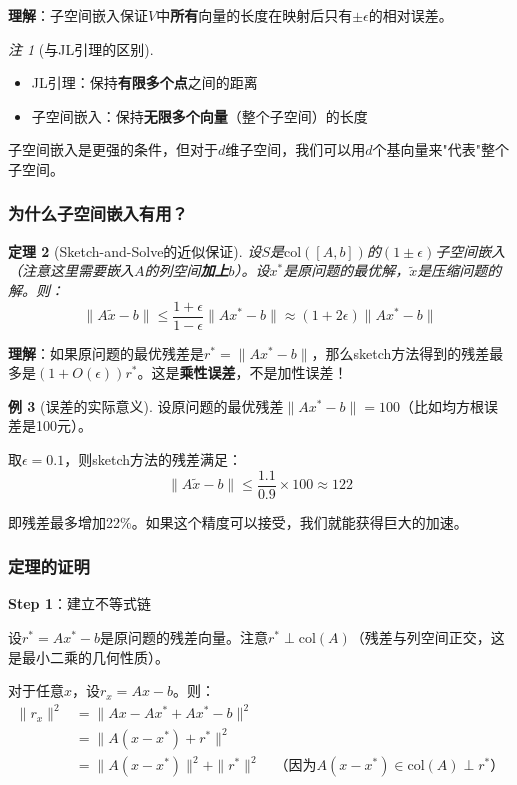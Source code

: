 \documentclass[11pt,a4paper]{ctexart}
\newtheorem{theorem}{定理}[section]
\theoremstyle{definition}
\newtheorem{example}[theorem]{例}
\theoremstyle{remark}
\newtheorem{remark}[theorem]{注}
\begin{document}
\textbf{理解}：子空间嵌入保证$V$中\textbf{所有}向量的长度在映射后只有$\pm \epsilon$的相对误差。

\begin{remark}[与JL引理的区别]
\begin{itemize}
    \item JL引理：保持\textbf{有限多个点}之间的距离
    \item 子空间嵌入：保持\textbf{无限多个向量}（整个子空间）的长度
\end{itemize}
子空间嵌入是更强的条件，但对于$d$维子空间，我们可以用$d$个基向量来"代表"整个子空间。
\end{remark}

\subsubsection{为什么子空间嵌入有用？}

\begin{theorem}[Sketch-and-Solve的近似保证]
设$S$是$\text{col}([A, b])$的$(1 \pm \epsilon)$子空间嵌入（注意这里需要嵌入$A$的列空间\textbf{加上}$b$）。设$x^*$是原问题的最优解，$\tilde{x}$是压缩问题的解。则：
\[
\|A\tilde{x} - b\| \leq \frac{1 + \epsilon}{1 - \epsilon} \|Ax^* - b\| \approx (1 + 2\epsilon)\|Ax^* - b\|
\]
\end{theorem}

\textbf{理解}：如果原问题的最优残差是$r^* = \|Ax^* - b\|$，那么sketch方法得到的残差最多是$(1 + O(\epsilon))r^*$。这是\textbf{乘性误差}，不是加性误差！

\begin{example}[误差的实际意义]
设原问题的最优残差$\|Ax^* - b\| = 100$（比如均方根误差是100元）。

取$\epsilon = 0.1$，则sketch方法的残差满足：
\[
\|A\tilde{x} - b\| \leq \frac{1.1}{0.9} \times 100 \approx 122
\]

即残差最多增加22\%。如果这个精度可以接受，我们就能获得巨大的加速。
\end{example}

\subsubsection{定理的证明}

\textbf{Step 1}：建立不等式链

设$r^* = Ax^* - b$是原问题的残差向量。注意$r^* \perp \text{col}(A)$（残差与列空间正交，这是最小二乘的几何性质）。

对于任意$x$，设$r_x = Ax - b$。则：
\begin{align*}
\|r_x\|^2 &= \|Ax - Ax^* + Ax^* - b\|^2 \\
&= \|A(x - x^*) + r^*\|^2 \\
&= \|A(x - x^*)\|^2 + \|r^*\|^2 \quad \text{（因为$A(x-x^*) \in \text{col}(A) \perp r^*$）}
\end{align*}
\end{document}
